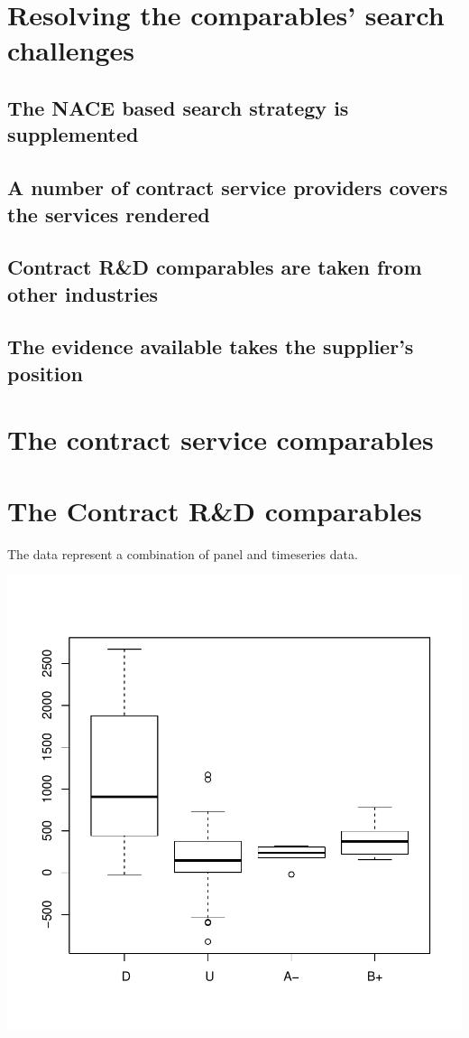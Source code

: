 \documentclass[12pt]{article}
\begin{document}
\section{Resolving the comparables' search challenges}
\subsection{The NACE based search strategy is supplemented}
\subsection{A number of contract service providers covers the services rendered}
\subsection{Contract R\&D comparables are taken from other industries}
\subsection{The evidence available takes the supplier's position}
\section{The contract service comparables}
\section{The Contract R\&D comparables}
The data represent a combination of panel and timeseries data. 
\begin{center}
\includegraphics{AVS_OS_Docu-002}
\end{center}
\end{document}
